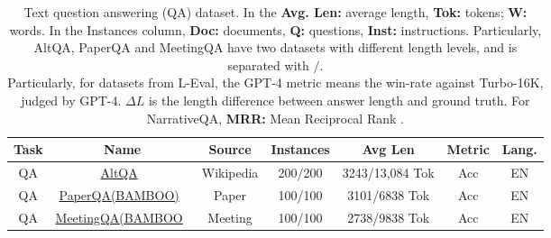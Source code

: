 \begin{table*}[t]
    \centering
    \caption{Text question answering (QA) dataset. In the \textbf{Avg. Len: }  average length, \textbf{Tok:}  tokens;  \textbf{W: } words. In the Instances column, \textbf{Doc:} documents, \textbf{Q:} questions, \textbf{Inst:} instructions. Particularly, AltQA, PaperQA and MeetingQA have two datasets  with different length levels, and is separated with $/$. \\
    Particularly, for datasets from L-Eval, the GPT-4 metric means the win-rate against Turbo-16K, judged by GPT-4. $\Delta L$ is the length difference between answer length and ground truth. For NarrativeQA, \textbf{MRR: }Mean Reciprocal Rank .} 
    \renewcommand{\arraystretch}{1.5} %
    \setlength{\tabcolsep}{1pt} %
    \label{tab:text-dataset-qa}
\begin{tabular}{c|c|c|c|c|c|c}
\hline
\textbf{Task} &
  \textbf{Name} &
  \textbf{Source} &
  \textbf{Instances} &
  \textbf{Avg Len} &
  \textbf{Metric} &
  \textbf{Lang.} \\ \hline
QA &
  \href{https://github.com/abacusai/long-context}{AltQA}~\cite{pal2023giraffeadventuresexpandingcontext} &
  Wikipedia &
  200/200 &
  3243/13,084 Tok&
  Acc &
  EN \\ \hline

QA &
  \href{https://github.com/RUCAIBox/BAMBOO/tree/main/datasets}{PaperQA(BAMBOO)}~\cite{dong2023bamboo} &
  Paper &
  100/100 &
  3101/6838 Tok&
  Acc &
  EN \\ \hline

QA &
  \href{https://github.com/RUCAIBox/BAMBOO/tree/main/datasets}{MeetingQA(BAMBOO}~\cite{dong2023bamboo}  &
  Meeting &
  100/100 &
  2738/9838 Tok&
  Acc &
  EN \\ \hline




\end{tabular}
\end{table*}
